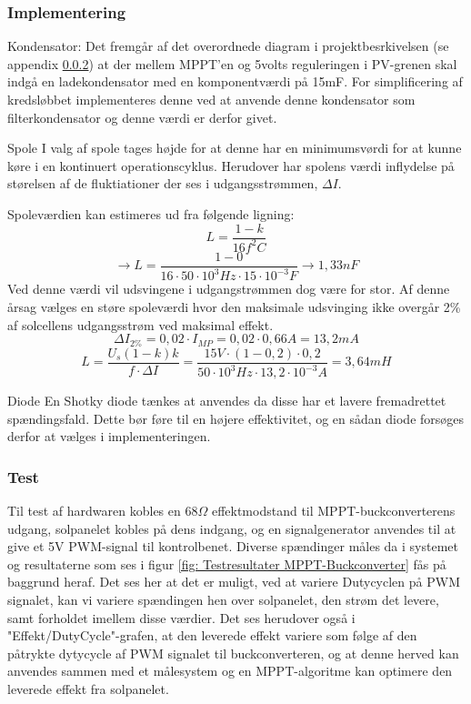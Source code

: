 \documentclass[../main.tex]{subfiles}
\begin{document}
        \subsubsection{Implementering}

            Kondensator:
            Det fremgår af det overordnede diagram i projektbesrkivelsen (se appendix \ref{}) at der mellem MPPT'en og 5volts reguleringen i PV-grenen skal indgå en ladekondensator med en komponentværdi på 15mF. For simplificering af kredsløbbet implementeres denne ved at anvende denne kondensator som filterkondensator og denne værdi er derfor givet.
            
            Spole
            I valg af spole tages højde for at denne har en minimumsvørdi for at kunne køre i en kontinuert operationscyklus. Herudover har spolens værdi inflydelse på størelsen af de fluktiationer der ses i udgangsstrømmen, $\Delta I$.\newline

            Spoleværdien kan estimeres ud fra følgende ligning:
            $$L = \frac{1-k}{16 f^2 C}$$
            $$\rightarrow L = \frac{1-0}{16\cdot 50\cdot 10^3 Hz \cdot 15\cdot 10^{-3}F} \rightarrow 1,33nF$$
            \newline
            Ved denne værdi vil udsvingene i udgangstrømmen dog være for stor. Af denne årsag vælges en støre spoleværdi hvor den maksimale udsvinging ikke overgår 2\% af solcellens udgangsstrøm ved maksimal effekt.
            $$\Delta I_{2\%} = 0,02 \cdot I_{MP} = 0,02 \cdot 0,66A = 13,2mA$$
            $$L = \frac{U_s(1-k)k}{f\cdot \Delta I} = \frac{15 V\cdot (1-0,2)\cdot 0,2}{50\cdot 10^3 Hz \cdot 13,2 \cdot 10^{-3} A} = 3,64mH$$\newline
            
            
            Diode
            En Shotky diode tænkes at anvendes da disse har et lavere fremadrettet spændingsfald. Dette bør føre til en højere effektivitet, og en sådan diode forsøges derfor at vælges i implementeringen.
            
            
        \subsubsection{Test}
            Til test af hardwaren kobles en $68\Omega$ effektmodstand til MPPT-buckconverterens udgang, solpanelet kobles på dens indgang, og en signalgenerator anvendes til at give et 5V PWM-signal til kontrolbenet. Diverse spændinger måles da i systemet og resultaterne som ses i figur \ref{fig: Testresultater MPPT-Buckconverter} fås på baggrund heraf.\newline
            Det ses her at det er muligt, ved at variere Dutycyclen på PWM signalet, kan vi variere spændingen hen over solpanelet, den strøm det levere, samt forholdet imellem disse værdier. Det ses herudover også i "Effekt/DutyCycle"-grafen, at den leverede effekt variere som følge af den påtrykte dytycycle af PWM signalet til buckconverteren, og at denne herved kan anvendes sammen med et målesystem og en MPPT-algoritme kan optimere den leverede effekt fra solpanelet.
            
\end{document}
